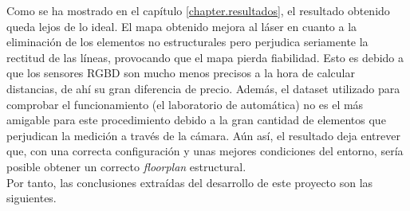 Como se ha mostrado en el capítulo \ref{chapter.resultados}, el resultado obtenido queda lejos de lo ideal. El mapa obtenido mejora al láser en cuanto a la eliminación de los elementos no estructurales pero perjudica seriamente la rectitud de las líneas, provocando que el mapa pierda fiabilidad. Esto es debido a que los sensores RGBD son mucho menos precisos a la hora de calcular distancias, de ahí su gran diferencia de precio. Además, el dataset utilizado para comprobar el funcionamiento (el laboratorio de automática) no es el más amigable para este procedimiento debido a la gran cantidad de elementos que perjudican la medición a través de la cámara. Aún así, el resultado deja entrever que, con una correcta configuración y unas mejores condiciones del entorno, sería posible obtener un correcto \textit{floorplan} estructural.\\

Por tanto, las conclusiones extraídas del desarrollo de este proyecto son las siguientes.

